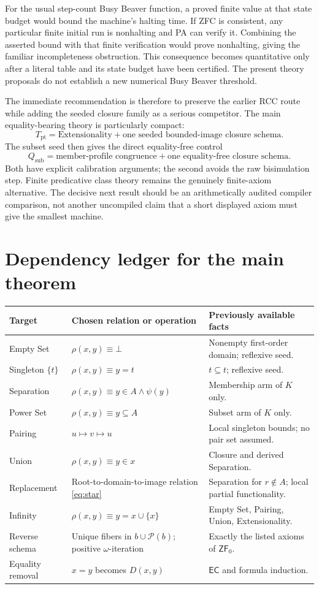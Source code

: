 \documentclass[11pt,letterpaper]{article}
\theoremstyle{definition}\newtheorem{definition}[theorem]{Definition}
\theoremstyle{remark}\newtheorem{remark}[theorem]{Remark}
\newcommand{\ZFz}{\mathsf{ZF}_{0}}
\newcommand{\Pow}{\mathcal{P}}
\newcommand{\EC}{\mathsf{EC}}
\newcommand{\Tpt}{T_{\mathrm{pt}}}
\newcommand{\QTsub}{Q_{\mathrm{sub}}}
\begin{document}
For the usual step-count Busy Beaver function, a proved finite value
at that state budget would bound the machine's halting time. If ZFC is
consistent, any particular finite initial run is nonhalting and PA can
verify it. Combining the asserted bound with that finite verification
would prove nonhalting, giving the familiar incompleteness obstruction.
This consequence becomes quantitative only after a literal table and
its state budget have been certified. The present theory proposals do
not establish a new numerical Busy Beaver threshold.

The immediate recommendation is therefore to preserve the earlier RCC
route while adding the seeded closure family as a serious competitor.
The main equality-bearing theory is particularly compact:
\[
 \boxed{\Tpt=\text{Extensionality}+\text{one seeded bounded-image closure schema}.}
\]
The subset seed then gives the direct equality-free control
\[
 \boxed{\QTsub=\text{member-profile congruence}+\text{one equality-free closure schema}.}
\]
Both have explicit calibration arguments; the second avoids the raw
bisimulation step. Finite predicative class theory remains the genuinely
finite-axiom alternative. The decisive next result should be an
arithmetically audited compiler comparison, not another uncompiled
claim that a short displayed axiom must give the smallest machine.

\appendix
\section{Dependency ledger for the main theorem}

\begin{longtable}{p{.20\linewidth}p{.38\linewidth}p{.32\linewidth}}
\toprule
Target & Chosen relation or operation & Previously available facts\\
\midrule\endhead
Empty Set & $\rho(x,y)\equiv\bot$ & Nonempty first-order domain; reflexive seed.\\
Singleton $\{t\}$ & $\rho(x,y)\equiv y=t$ & $t\subseteq t$; reflexive seed.\\
Separation & $\rho(x,y)\equiv y\in A\land\psi(y)$ & Membership arm of $K$ only.\\
Power Set & $\rho(x,y)\equiv y\subseteq A$ & Subset arm of $K$ only.\\
Pairing & $u\mapsto v\mapsto u$ & Local singleton bounds; no pair set assumed.\\
Union & $\rho(x,y)\equiv y\in x$ & Closure and derived Separation.\\
Replacement & Root-to-domain-to-image relation \eqref{eq:star} & Separation for $r\notin A$; local partial functionality.\\
Infinity & $\rho(x,y)\equiv y=x\cup\{x\}$ & Empty Set, Pairing, Union, Extensionality.\\
Reverse schema & Unique fibers in $b\cup\Pow(b)$; positive $\omega$-iteration & Exactly the listed axioms of $\ZFz$.\\
Equality removal & $x=y$ becomes $D(x,y)$ & $\EC$ and formula induction.\\
\bottomrule
\end{longtable}
\end{document}
